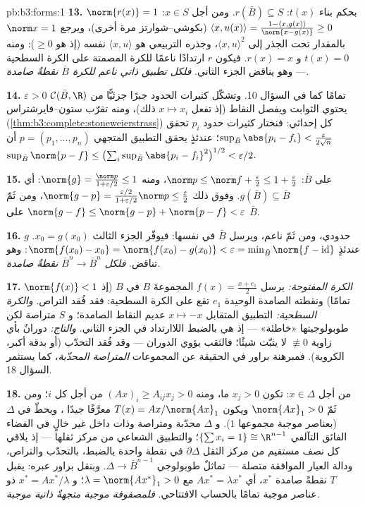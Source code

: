 \begin{solution}{pb:b3:forms:1}
\textbf{13.} $\norm{r(x)} = 1$ بحكم بناء $t(x)$: $r(\bar B) \subseteq S$. ومن أجل
$x \in S$: $\langle x,
u(x)\rangle = \frac{1 - \langle x, g(x)\rangle}{\norm{x -
g(x)}} \geq 0$ (بكوشي--شوارتز مرة أخرى)، ويرجع $\norm x =
1$
بالمقدار تحت الجذر إلى $\langle x, u\rangle^2$، وجذره التربيعي هو $\langle x, u\rangle$ نفسه
(إذ هو $\geq
0$): ومنه $t(x) = 0$ و $r(x) = x$. فيكون $r$
ارتدادًا ناعمًا للكرة المصمتة على الكرة السطحية --- وهو يناقض
الجزء الثاني. \emph{فلكل تطبيق ذاتي ناعم للكرة $\bar B$ نقطةٌ
صامدة.}

\textbf{14.} $\varepsilon > 0$ تمامًا كما في السؤال 10. وتشكّل كثيرات
الحدود جبرًا جزئيًّا من $\mathcal C(\bar B,
\R)$ يحتوي الثوابت ويفصل النقاط (إذ
تفعل $x
\mapsto x_i$ ذلك)، ومنه تقرّب ستون--فايرشتراس (\cref{thm:b3:complete:stoneweierstrass}) كل
إحداثي: فنختار كثيرات حدود $p_i$ تحقق $\sup_{\bar
B}\abs{p_i - f_i} < \frac{\varepsilon}{2\sqrt n}$؛ عندئذٍ يحقق
التطبيق المتجهي $p = (p_1, \dots, p_n)$ أن $\sup_{\bar B}\norm{p - f} \leq
\bigl(\sum_i\sup_{\bar B}\abs{p_i - f_i}^2\bigr)^{1/2} <
\varepsilon/2$.

\textbf{15.} على $\bar B$: $\norm p \leq \norm f +
\frac\varepsilon2 \leq 1 + \frac\varepsilon2$، ومنه $\norm{g} = \frac{\norm p}{1 + \varepsilon/2} \leq 1$: أي $g(\bar B) \subseteq \bar B$.
وفوق ذلك $\norm{g - p} =
\frac{\varepsilon/2}{1 + \varepsilon/2}\norm p \leq
\frac\varepsilon2$، ومن ثَمّ $\norm{g - f} \leq \norm{g - p} +
\norm{p - f} < \varepsilon$ على $\bar B$.

\textbf{16.} $g$ حدودي، ومن ثَمّ ناعم، ويرسل $\bar B$ في نفسها:
فيوفّر الجزء الثالث $x_0 = g(x_0)$. عندئذٍ $\norm{f(x_0) - x_0} = \norm{f(x_0) - g(x_0)} <
\varepsilon = \min_{\bar B}\norm{f - \operatorname{id}}$: وهو تناقض.
\emph{فلكل  $\bar B^n \to
\bar B^n$ نقطةٌ صامدة.}

\textbf{17.} \emph{الكرة المفتوحة:} يرسل $f(x) = \frac{x + e_1}2$ المجموعةَ $B$
في $B$ (إذ $\norm{f(x)} < 1$ تمامًا) ونقطته الصامدة الوحيدة $e_1$ تقع على
الكرة السطحية: فقد فُقد التراص. \emph{والكرة السطحية:} التطبيق
المتقابل $x \mapsto -x$ عديم النقاط الصامدة؛ و $S$ متراصة لكن
طوبولوجيتها «خاطئة» --- إذ هي بالضبط اللاارتداد في الجزء
الثاني. \emph{والتاج:} دورانٌ بأي زاوية $\not\equiv 0$ لا يثبّت
شيئًا؛ فالثقب يؤوي الدوران --- وقد فُقد التحدّب (أو بدقة أكبر،
 الكروية). فمبرهنة براور في الحقيقة عن المجموعات
\emph{المتراصة المحدّبة}، كما يستثمر السؤال 18.

\textbf{18.} من أجل $x \in \Delta$: تكون $x_j > 0$ ما، ومنه
$(Ax)_i
\geq A_{ij}x_j > 0$ من أجل كل $i$؛ ومن ثَمّ $\norm{Ax}_1 > 0$ ويكون $T(x) = Ax/\norm{Ax}_1$ معرَّفًا
جيدًا ، ويحطّ في $\Delta$ (بعناصر موجبة مجموعها $1$).
و $\Delta$ محدّبة ومتراصة وذات داخل غير خالٍ في الفضاء الفائق
التآلفي $\{\sum x_i = 1\} \cong \R^{n-1}$؛ والتطبيق الشعاعي من مركز ثقلها --- إذ يلاقي
كل نصف مستقيم من مركز الثقل $\partial\Delta$ في نقطة واحدة
بالضبط، بالتحدّب والتراص، ودالة العيار الموافقة متصلة --- تماثلٌ
طوبولوجي $\Delta \to
\bar B^{n-1}$. وبنقل براور عبره: يقبل $T$ نقطةً صامدة
$x^*$، أي $Ax^* = \lambda x^*$ مع $\lambda
= \norm{Ax^*}_1 > 0$؛ و $x^* = Ax^*/\lambda$ ذو عناصر موجبة تمامًا
بالحساب الافتتاحي. \emph{فلمصفوفة موجبة متجهةٌ ذاتية موجبة.}


\end{solution}
